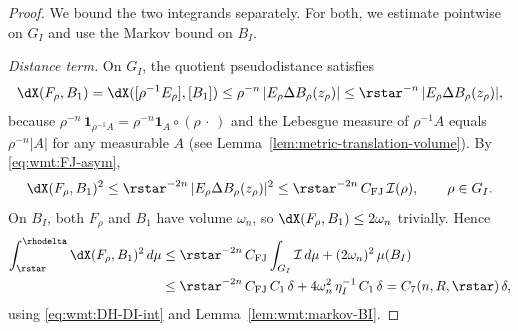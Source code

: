 \begin{proof}
We bound the two integrands separately. For both, we estimate
pointwise on $G_I$ and use the Markov bound on $B_I$.

\emph{Distance term.} On $G_I$, the quotient pseudodistance satisfies
\begin{equation}\label{eq:wmt:dist-trivial}
   \dX(F_\rho,B_1)
   =\dX([\rho^{-1}E_\rho],[B_1])
   \le \rho^{-n}\,|E_\rho\Delta B_\rho(z_\rho)|
   \le \rstar^{-n}\,|E_\rho\Delta B_\rho(z_\rho)|,
\end{equation}
because $\rho^{-n}\,\mathbf{1}_{\rho^{-1}A}=\rho^{-n}\mathbf{1}_A\circ
(\rho\,\cdot\,)$ and the Lebesgue measure of $\rho^{-1}A$ equals
$\rho^{-n}|A|$ for any measurable $A$ (see
Lemma~\ref{lem:metric-translation-volume}). By \eqref{eq:wmt:FJ-asym},
\[
   \dX(F_\rho,B_1)^2
   \le \rstar^{-2n}\,|E_\rho\Delta B_\rho(z_\rho)|^2
   \le \rstar^{-2n}\,C_{\mathrm{FJ}}\,\mathcal I(\rho),
   \qquad\rho\in G_I.
\]
On $B_I$, both $F_\rho$ and $B_1$ have volume $\omega_n$, so
$\dX(F_\rho,B_1)\le 2\omega_n$ trivially. Hence
\begin{align*}
   \int_{\rstar}^{\rhodelta}\dX(F_\rho,B_1)^2\,d\mu
   &\le \rstar^{-2n}\,C_{\mathrm{FJ}}\int_{G_I}\mathcal I\,d\mu
       +(2\omega_n)^2\,\mu(B_I)\\
   &\le \rstar^{-2n}\,C_{\mathrm{FJ}}\,C_1\,\delta
       +4\omega_n^2\,\eta_I^{-1}\,C_1\,\delta
   = C_7(n,R,\rstar)\,\delta,
\end{align*}
using \eqref{eq:wmt:DH-DI-int} and Lemma~\ref{lem:wmt:markov-BI}.


\end{proof}
